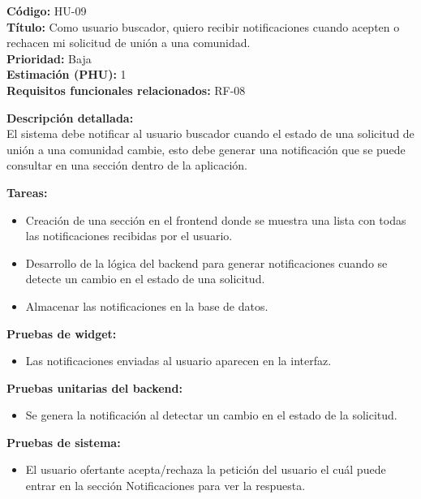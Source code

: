 \begin{tarjetaHU}
\textbf{Código:} HU-09 \\
\textbf{Título:} Como usuario buscador, quiero recibir notificaciones cuando acepten o rechacen mi solicitud de unión a una comunidad. \\
\textbf{Prioridad:} Baja \\
\textbf{Estimación (PHU):} 1 \\
\textbf{Requisitos funcionales relacionados:} RF-08

\vspace{0.5em}
\textbf{Descripción detallada:} \\
El sistema debe notificar al usuario buscador cuando el estado de una solicitud de unión a una comunidad cambie, esto debe generar una notificación que se puede consultar en una sección dentro de la aplicación.

\vspace{0.5em}
\textbf{Tareas:}
\begin{itemize}[left=0pt]
  \item Creación de una sección en el frontend donde se muestra una lista con todas las notificaciones recibidas por el usuario. 
  \item Desarrollo de la lógica del backend para generar notificaciones cuando se detecte un cambio en el estado de una solicitud.
  \item Almacenar las notificaciones en la base de datos.
\end{itemize}

\vspace{0.5em}
\textbf{Pruebas de widget:}
\begin{itemize}[left=0pt]
  \item Las notificaciones enviadas al usuario aparecen en la interfaz.
\end{itemize}
\textbf{Pruebas unitarias del backend:}
\begin{itemize}[left=0pt]
  \item Se genera la notificación al detectar un cambio en el estado de la solicitud.
\end{itemize}
\textbf{Pruebas de sistema:}
\begin{itemize}[left=0pt]
  \item El usuario ofertante acepta/rechaza la petición del usuario el cuál puede entrar en la sección Notificaciones para ver la respuesta.
\end{itemize}
\end{tarjetaHU}

